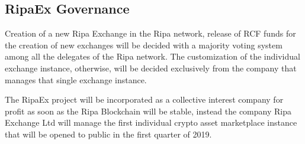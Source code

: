 \documentclass[11pt,fleqn]{book} %
\begin{document}
\subsection{RipaEx Governance}
Creation of a new Ripa Exchange in the Ripa network, release of RCF funds for the creation of new exchanges will be
decided with a majority voting system among all the delegates of the Ripa network. The customization of the individual
exchange instance, otherwise, will be decided exclusively from the company that manages that single exchange
instance.

The RipaEx project will be incorporated as a collective interest company for profit as soon as the Ripa Blockchain
will be stable, instead the company Ripa Exchange Ltd will manage the first individual crypto asset marketplace
instance that will be opened to public in the first quarter of 2019.
\end{document}
